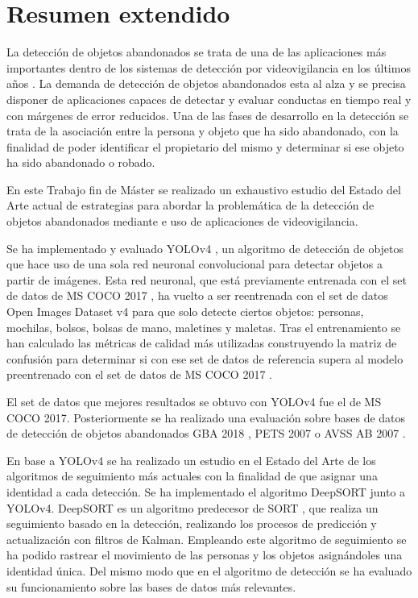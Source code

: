 
\chapter*{Resumen extendido}
\label{cha:resumen-extendido}


La detección de objetos abandonados se trata de una de las aplicaciones más importantes dentro de los sistemas de detección por videovigilancia en los últimos años \cite{DBLP:journals/spm/PlataniotisR05}. La demanda de detección de objetos abandonados esta al alza y se precisa disponer de aplicaciones capaces de detectar y evaluar conductas en tiempo real y con márgenes de error reducidos. Una de las fases de desarrollo en la detección se trata de la asociación entre la persona y objeto que ha sido abandonado, con la finalidad de poder identificar el propietario del mismo y determinar si ese objeto ha sido abandonado o robado.

En este Trabajo fin de Máster se realizado un exhaustivo estudio del Estado del Arte actual de estrategias para abordar la problemática de la detección de objetos abandonados mediante e uso de aplicaciones de videovigilancia.

Se ha implementado y evaluado YOLOv4 \cite{bochkovskiy2020yolov4}, un algoritmo de detección de objetos que hace uso de una sola red neuronal convolucional para detectar objetos a partir de imágenes. Esta red neuronal, que está previamente entrenada con el set de datos de MS COCO 2017 \cite{lin2015microsoft}, ha vuelto a ser reentrenada con el set de datos Open Images Dataset v4 \cite{Kuznetsova_2020} para que solo detecte ciertos objetos: personas, mochilas, bolsos, bolsas de mano, maletines y maletas. Tras el entrenamiento se han calculado las métricas de calidad más utilizadas construyendo la matriz de confusión para determinar si con ese set de datos de referencia supera al modelo preentrenado con el set de datos de MS COCO 2017 \cite{lin2015microsoft}.

El set de datos que mejores resultados se obtuvo con YOLOv4 \cite{bochkovskiy2020yolov4} fue el de MS COCO 2017. Posteriormente se ha realizado una evaluación sobre bases de datos de detección de objetos abandonados GBA 2018 \cite{gba-dataset}, PETS 2007 \cite{pets2007-dataset} o AVSS AB 2007 \cite{AVSSAB2007-dataset}. 

En base a YOLOv4 se ha realizado un estudio en el Estado del Arte de los algoritmos de seguimiento más actuales con la finalidad de que asignar una identidad a cada detección. Se ha implementado el algoritmo DeepSORT \cite{Wojke2017simple} junto a YOLOv4. DeepSORT  es un algoritmo predecesor de SORT \cite{Bewley_2016}, que realiza un seguimiento basado en la detección, realizando los procesos de predicción y actualización con filtros de Kalman. Empleando este algoritmo de seguimiento se ha podido rastrear el movimiento de las personas y los objetos asignándoles una identidad única. Del mismo modo que en el algoritmo de detección se ha evaluado su funcionamiento sobre las bases de datos más relevantes.

